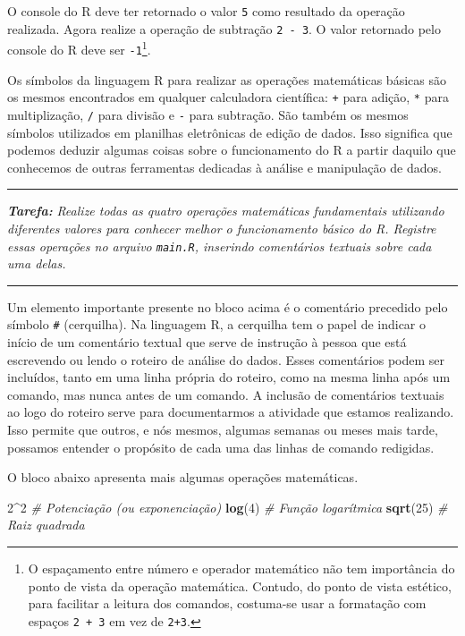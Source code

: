 \documentclass[
]{book}
\newenvironment{Shaded}{\begin{snugshade}}{\end{snugshade}}
\newcommand{\CommentTok}[1]{\textcolor[rgb]{0.56,0.35,0.01}{\textit{#1}}}
\newcommand{\DecValTok}[1]{\textcolor[rgb]{0.00,0.00,0.81}{#1}}
\newcommand{\KeywordTok}[1]{\textcolor[rgb]{0.13,0.29,0.53}{\textbf{#1}}}
\newcommand{\NormalTok}[1]{#1}
\newcommand{\OperatorTok}[1]{\textcolor[rgb]{0.81,0.36,0.00}{\textbf{#1}}}
\begin{document}
O console do R deve ter retornado o valor \texttt{5} como resultado da operação realizada. Agora realize a operação de subtração \texttt{2\ -\ 3}. O valor retornado pelo console do R deve ser \texttt{-1}\footnote{O espaçamento entre número e operador matemático não tem importância do ponto de vista da operação matemática. Contudo, do ponto de vista estético, para facilitar a leitura dos comandos, costuma-se usar a formatação com espaços \texttt{2\ +\ 3} em vez de \texttt{2+3}.}.

Os símbolos da linguagem R para realizar as operações matemáticas básicas são os mesmos encontrados em qualquer calculadora científica: \texttt{+} para adição, \texttt{*} para multiplização, \texttt{/} para divisão e \texttt{-} para subtração. São também os mesmos símbolos utilizados em planilhas eletrônicas de edição de dados. Isso significa que podemos deduzir algumas coisas sobre o funcionamento do R a partir daquilo que conhecemos de outras ferramentas dedicadas à análise e manipulação de dados.

\begin{center}\rule{0.5\linewidth}{0.5pt}\end{center}

\textbf{\emph{Tarefa:}} \emph{Realize todas as quatro operações matemáticas fundamentais utilizando diferentes valores para conhecer melhor o funcionamento básico do R. Registre essas operações no arquivo \texttt{main.R}, inserindo comentários textuais sobre cada uma delas.}

\begin{center}\rule{0.5\linewidth}{0.5pt}\end{center}

Um elemento importante presente no bloco acima é o comentário precedido pelo símbolo \texttt{\#} (cerquilha). Na linguagem R, a cerquilha tem o papel de indicar o início de um comentário textual que serve de instrução à pessoa que está escrevendo ou lendo o roteiro de análise do dados. Esses comentários podem ser incluídos, tanto em uma linha própria do roteiro, como na mesma linha após um comando, mas nunca antes de um comando. A inclusão de comentários textuais ao logo do roteiro serve para documentarmos a atividade que estamos realizando. Isso permite que outros, e nós mesmos, algumas semanas ou meses mais tarde, possamos entender o propósito de cada uma das linhas de comando redigidas.

O bloco abaixo apresenta mais algumas operações matemáticas.

\begin{Shaded}
\begin{Highlighting}[]
\DecValTok{2}\OperatorTok{^}\DecValTok{2}      \CommentTok{# Potenciação (ou exponenciação)}
\KeywordTok{log}\NormalTok{(}\DecValTok{4}\NormalTok{)   }\CommentTok{# Função logarítmica}
\KeywordTok{sqrt}\NormalTok{(}\DecValTok{25}\NormalTok{) }\CommentTok{# Raiz quadrada}
\end{Highlighting}
\end{Shaded}
\end{document}
